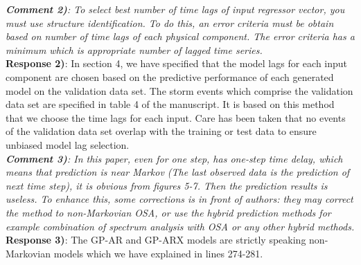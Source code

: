\documentclass{article}
\begin{document}
\textit{
\textbf{Comment 2)}: To select best number of time lags of input regressor vector, you must use structure identification. To do this, an error criteria must be obtain based on number of time lags of each physical component. The error criteria has a minimum which is appropriate number of lagged time series. }\\

\textbf{Response 2)}: In section 4, we have specified that the model lags for each input component are chosen based on the predictive performance of each generated model on the validation data set. The storm events which comprise the validation data set are specified in table 4 of the manuscript. It is based on this method that we choose the time lags for each input. Care has been taken that no events of the validation data set overlap with the training or test data to ensure unbiased model lag selection.\\

\textit{
\textbf{Comment 3)}: In this paper, even for one step, has one-step time delay, which means that prediction is near Markov (The last observed data is the prediction of next time step), it is obvious from figures 5-7. Then the prediction results is useless. To enhance this, some corrections is in front of authors: they may correct the method to non-Markovian OSA, or use the hybrid prediction methods for example combination of spectrum analysis with OSA or any other hybrid methods.
}\\

\textbf{Response 3)}: The GP-AR and GP-ARX models are strictly speaking non-Markovian models which we have explained in lines 274-281.\\
\\
\end{document}

